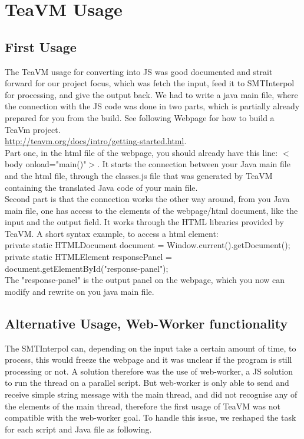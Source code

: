 \documentclass[]{article}
\begin{document}
\section{TeaVM Usage}

\subsection{First Usage}

The TeaVM usage for converting into JS was good documented and strait forward for our project focus, which was fetch the input, feed it to SMTInterpol for processing, and give the output back. We had to write a java main file, where the connection with the JS code was done in two parts, which is partially already prepared for you from the build. See following Webpage for how to build a TeaVm project. \\ \href{http://teavm.org/docs/intro/getting-started.html}{http://teavm.org/docs/intro/getting-started.html}. \\
Part one, in the html file of the webpage, you should already have this line: $<$body onload="main()"$>$. It starts the connection between your Java main file and the html file, through the classes.js file that was generated by TeaVM containing the translated Java code of your main file.\\
Second part is that the connection works the other way around, from you Java main file, one has access to the elements of the webpage/html document, like the input and the output field. It works through the HTML libraries provided by TeaVM. A short syntax example, to access a html element:  \\
private static HTMLDocument document = Window.current().getDocument(); \\
private static HTMLElement responsePanel = document.getElementById("response-panel"); \\ The "response-panel" is the output panel on the webpage, which you now can modify and rewrite on you java main file. 

\subsection{Alternative Usage, Web-Worker functionality}

The SMTInterpol can, depending on the input take a certain amount of time, to process, this would freeze the webpage and it was unclear if the program is still processing or not. A solution therefore was the use of web-worker, a JS solution to run the thread on a parallel script. But web-worker is only able to send and receive simple string message with the main thread, and did not recognise any of the elements of the main thread, therefore the first usage of TeaVM was not compatible with the web-worker goal. To handle this issue, we reshaped the task for each script and Java file as following.
\end{document}
